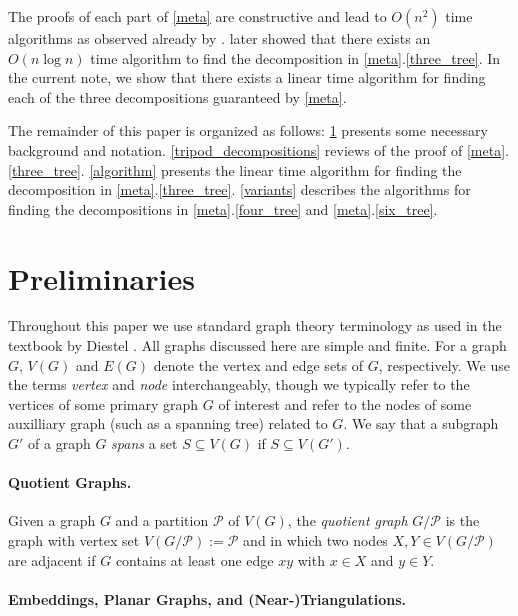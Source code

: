 \documentclass{patmorin}
\begin{document}
The proofs of each part of \cref{meta} are constructive and lead to $O(n^2)$ time algorithms as observed already by \citet{dujmovic.joret.ea:planar}.  \citet{morin:fast} later showed that there exists an $O(n\log n)$ time algorithm to find the decomposition in \cref{meta}.\ref{three_tree}.  In the current note, we show that there exists a linear time algorithm for finding each of the three decompositions guaranteed by \cref{meta}.

The remainder of this paper is organized as follows: \cref{prelims} presents some necessary background and notation.  \cref{tripod_decompositions} reviews of the proof of \cref{meta}.\ref{three_tree}.  \cref{algorithm} presents the linear time algorithm for finding the decomposition in \cref{meta}.\ref{three_tree}.  \cref{variants} describes the algorithms for finding the decompositions in \cref{meta}.\ref{four_tree} and \cref{meta}.\ref{six_tree}.

\section{Preliminaries}
\label{prelims}

Throughout this paper we use standard graph theory terminology as used in the textbook by Diestel \cite{diestel:graph}.  All graphs discussed here are simple and finite.  For a graph $G$, $V(G)$ and $E(G)$ denote the vertex and edge sets of $G$, respectively.  We use the terms \emph{vertex} and \emph{node} interchangeably, though we typically refer to the vertices of some primary graph $G$ of interest and refer to the nodes of some auxilliary graph (such as a spanning tree) related to $G$.  We say that a subgraph $G'$ of a graph $G$ \emph{spans} a set $S\subseteq V(G)$ if $S\subseteq V(G')$.


\paragraph{Quotient Graphs.}

Given a graph $G$ and a partition $\mathcal{P}$ of $V(G)$, the \emph{quotient graph} $G/\mathcal{P}$ is the graph with vertex set $V(G/\mathcal{P}):=\mathcal{P}$ and in which two nodes $X,Y\in V(G/\mathcal{P})$ are adjacent if $G$ contains at least one edge $xy$ with $x\in X$ and $y\in Y$.

\paragraph{Embeddings, Planar Graphs, and (Near-)Triangulations.}
\end{document}
